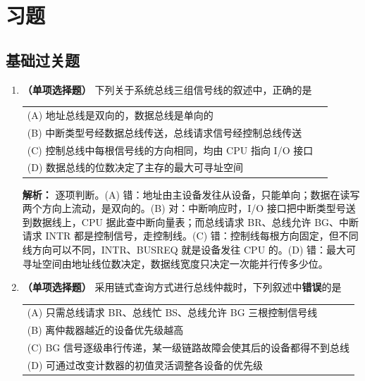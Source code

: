 \newpage
\section{习题}

\subsection{基础过关题}

\begin{enumerate}

\item \textbf{（单项选择题）} 下列关于系统总线三组信号线的叙述中，正确的是

\nopagebreak[4]
\begin{center}
\begin{tabular}{ll}
(A) 地址总线是双向的，数据总线是单向的 \\[4pt]
(B) 中断类型号经数据总线传送，总线请求信号经控制总线传送 \\[4pt]
(C) 控制总线中每根信号线的方向相同，均由 CPU 指向 I/O 接口 \\[4pt]
(D) 数据总线的位数决定了主存的最大可寻址空间
\end{tabular}
\end{center}

\ifshowsolutions\par\noindent\textbf{解析：} 逐项判断。(A) 错：地址由主设备发往从设备，只能单向；数据在读写两个方向上流动，是双向的。(B) 对：中断响应时，I/O 接口把中断类型号送到数据线上，CPU 据此查中断向量表；而总线请求 BR、总线允许 BG、中断请求 INTR 都是控制信号，走控制线。(C) 错：控制线每根方向固定，但不同线方向可以不同，INTR、BUSREQ 就是设备发往 CPU 的。(D) 错：最大可寻址空间由地址线位数决定，数据线宽度只决定一次能并行传多少位。\else \answerarea \fi

\item \textbf{（单项选择题）} 采用链式查询方式进行总线仲裁时，下列叙述中\textbf{错误}的是

\nopagebreak[4]
\begin{center}
\begin{tabular}{l}
(A) 只需总线请求 BR、总线忙 BS、总线允许 BG 三根控制信号线 \\[4pt]
(B) 离仲裁器越近的设备优先级越高 \\[4pt]
(C) BG 信号逐级串行传递，某一级链路故障会使其后的设备都得不到总线 \\[4pt]
(D) 可通过改变计数器的初值灵活调整各设备的优先级
\end{tabular}
\end{center}


\end{enumerate}
